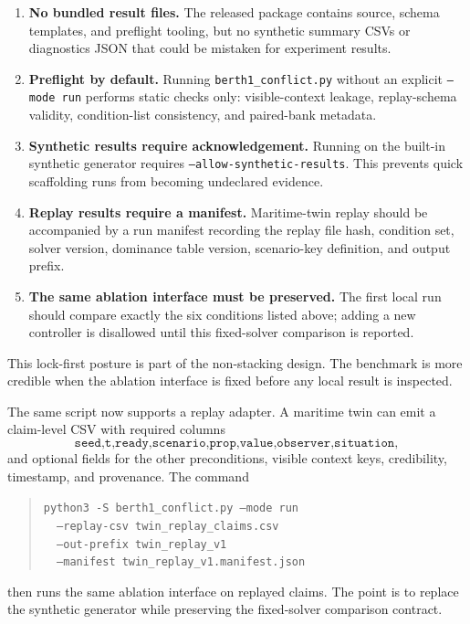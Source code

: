 \documentclass[11pt]{article}
\newcommand{\1}{\mathbf{1}}
\theoremstyle{definition}
\theoremstyle{plain}
\theoremstyle{remark}
\begin{document}
\begin{enumerate}[leftmargin=1.7em,label=\textbf{C\arabic*:}]
\item \textbf{No bundled result files.} The released package contains source, schema templates, and preflight tooling, but no synthetic summary CSVs or diagnostics JSON that could be mistaken for experiment results.
\item \textbf{Preflight by default.} Running \texttt{berth1\_conflict.py} without an explicit \texttt{--mode run} performs static checks only: visible-context leakage, replay-schema validity, condition-list consistency, and paired-bank metadata.
\item \textbf{Synthetic results require acknowledgement.} Running on the built-in synthetic generator requires \texttt{--allow-synthetic-results}. This prevents quick scaffolding runs from becoming undeclared evidence.
\item \textbf{Replay results require a manifest.} Maritime-twin replay should be accompanied by a run manifest recording the replay file hash, condition set, solver version, dominance table version, scenario-key definition, and output prefix.
\item \textbf{The same ablation interface must be preserved.} The first local run should compare exactly the six conditions listed above; adding a new controller is disallowed until this fixed-solver comparison is reported.
\end{enumerate}

This lock-first posture is part of the non-stacking design. The benchmark is more credible when the ablation interface is fixed before any local result is inspected.

The same script now supports a replay adapter. A maritime twin can emit a claim-level CSV with required columns
\[
\texttt{seed,t,ready,scenario,prop,value,observer,situation},
\]
and optional fields for the other preconditions, visible context keys, credibility, timestamp, and provenance. The command
\begin{quote}
\small
\texttt{python3 -S berth1\_conflict.py --mode run}\\
\texttt{\ \ --replay-csv twin\_replay\_claims.csv}\\
\texttt{\ \ --out-prefix twin\_replay\_v1}\\
\texttt{\ \ --manifest twin\_replay\_v1.manifest.json}
\end{quote}
then runs the same ablation interface on replayed claims. The point is to replace the synthetic generator while preserving the fixed-solver comparison contract.
\end{document}

